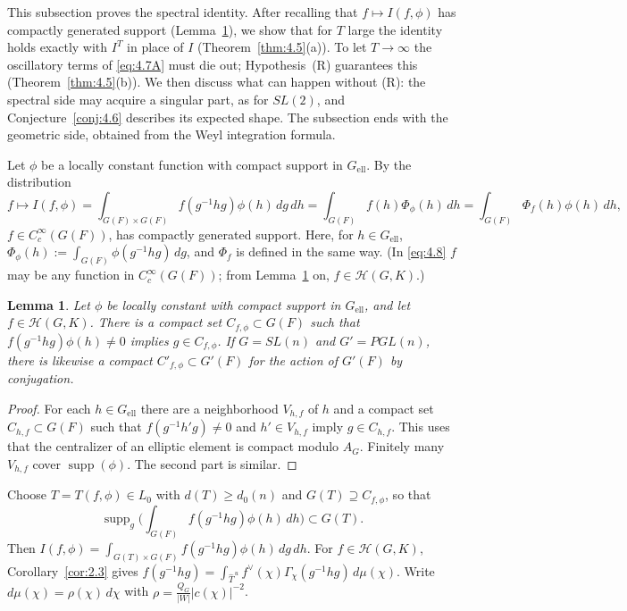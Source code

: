 \documentclass[12pt,letterpaper]{article}
\numberwithin{equation}{section}
\theoremstyle{plain}
\newtheorem{lemma}{Lemma}[section]
\theoremstyle{remark}
\theoremstyle{plain}
\theoremstyle{definition}
\theoremstyle{remark}
\theoremstyle{remark}
\newcommand{\Hc}{\mathcal{H}}
\newcommand{\Thu}{\widehat{T}^{\,u}}
\DeclareMathOperator{\supp}{supp}
\newcommand{\ellr}{\mathrm{ell}}
\begin{document}
This subsection proves the spectral identity. After recalling that $f\mapsto I(f,\phi)$ has compactly generated support (Lemma~\ref{lem:4.4}), we show that for $T$ large the identity holds exactly with $I^T$ in place of $I$ (Theorem~\ref{thm:4.5}(a)). To let $T\to\infty$ the oscillatory terms of \eqref{eq:4.7A} must die out; Hypothesis~(R) guarantees this (Theorem~\ref{thm:4.5}(b)). We then discuss what can happen without (R): the spectral side may acquire a singular part, as for $SL(2)$, and Conjecture~\ref{conj:4.6} describes its expected shape. The subsection ends with the geometric side, obtained from the Weyl integration formula.


Let $\phi$ be a locally constant function with compact support in $G_{\ellr}$. By \cite[\S4, Lemma~6]{Ka86} the distribution
\begin{equation}\label{eq:4.8}
f\longmapsto I(f,\phi)=\int_{G(F)\times G(F)}f(g^{-1}hg)\phi(h)\,dg\,dh=\int_{G(F)}f(h)\Phi_\phi(h)\,dh=\int_{G(F)}\Phi_f(h)\phi(h)\,dh,
\end{equation}
$f\in C_c^\infty(G(F))$, has compactly generated support. Here, for $h\in G_{\ellr}$, $\Phi_\phi(h):=\int_{G(F)}\phi(g^{-1}hg)\,dg$, and $\Phi_f$ is defined in the same way. (In \eqref{eq:4.8} $f$ may be any function in $C_c^\infty(G(F))$; from Lemma~\ref{lem:4.4} on, $f\in\Hc(G,K)$.)

\begin{lemma}\label{lem:4.4}
Let $\phi$ be locally constant with compact support in $G_{\ellr}$, and let $f\in\Hc(G,K)$. There is a compact set $C_{f,\phi}\subset G(F)$ such that $f(g^{-1}hg)\phi(h)\ne0$ implies $g\in C_{f,\phi}$. If $G=SL(n)$ and $G'=PGL(n)$, there is likewise a compact $C'_{f,\phi}\subset G'(F)$ for the action of $G'(F)$ by conjugation.
\end{lemma}

\begin{proof}
For each $h\in G_{\ellr}$ there are a neighborhood $V_{h,f}$ of $h$ and a compact set $C_{h,f}\subset G(F)$ such that $f(g^{-1}h'g)\ne0$ and $h'\in V_{h,f}$ imply $g\in C_{h,f}$. This uses that the centralizer of an elliptic element is compact modulo $A_G$. Finitely many $V_{h,f}$ cover $\supp(\phi)$. The second part is similar.
\end{proof}

Choose $T=T(f,\phi)\in L_0$ with $d(T)\ge d_0(n)$ and $G(T)\supseteq C_{f,\phi}$, so that
\begin{equation}\label{eq:4.9}
\supp_g\Big(\int_{G(F)}f(g^{-1}hg)\phi(h)\,dh\Big)\subset G(T).
\end{equation}
Then $I(f,\phi)=\int_{G(T)\times G(F)}f(g^{-1}hg)\phi(h)\,dg\,dh$. For $f\in\Hc(G,K)$, Corollary~\ref{cor:2.3} gives $f(g^{-1}hg)=\int_{\Thu}f^\vee(\chi)\Gamma_\chi(g^{-1}hg)\,d\mu(\chi)$. Write $d\mu(\chi)=\rho(\chi)\,d\chi$ with $\rho=\frac{Q_G}{|W|}|c(\chi)|^{-2}$.
\end{document}
